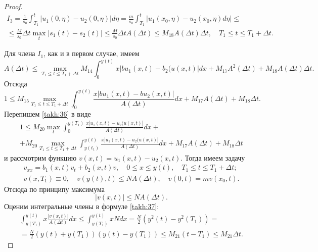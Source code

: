 \begin{proof}
\begin{multline*}
I_3=\frac{1}{s_0}\int_{T_1}^{t}\left|u_1(0,\eta)-u_2(0,\eta)\right|d\eta= %
\frac{m}{s_0}\int_{T_1}^{t}\left|u_1(x_0,\eta)-u_2(x_0,\eta)d\eta\right|\leq 
\\ \leq
\frac{M}{s_0}\Delta t\max\limits_{t}|s_1(t)-s_2(t)| %
\leq\frac{M}{s_0}\Delta tA(\Delta t) \leq M_{18}A(\Delta t)\Delta t, \quad
 T_1\leq t\leq T_1+\Delta t.
\end{multline*}

\noindent
Для члена $I_1$, как и в первом случае, имеем
$$
A(\Delta t)\leq \!\max \limits_{T_1\leq t\leq T_1+\Delta t}M_{14} \!\! \int
_{0}^{y(t)} \!\!\! x|bu_1(x,t)-b_2(u(x,t)|dx+M_{17}A^2(\Delta
t)+M_{18}A(\Delta t)\Delta t.
$$
Отсюда
\begin{equation}
1\leq M_{15}\max\limits_{T_1\leq t\leq T_1+\Delta t}\int
_{0}^{y(t)}\frac{x|bu_1(x,t)-bu_2(x,t)|}{A(\Delta
t)}dx+M_{17}A(\Delta t) +M_{18}\Delta t. 
\label{takh:36}
\end{equation}
Перепишем \eqref{takh:36} в виде
\begin{multline}
1\leq M_{20}\max\limits_{t}\int
_{0}^{y(T_1)}\frac{x|u_1(x,t)-u_2(u(x,t)|}{A(\Delta t)}dx+
\\
+M_{20}\max\limits_{T_1\leq t\leq T_1+\Delta t}\int
_{y(t_1)}^{y(t)}\frac{x|u_1(x,t)-u_2(u(x,t)|}{A(\Delta
t)}dx+ M_{17}A(\Delta t)+M_{18}\Delta t
\label{takh:37}
\end{multline}
и рассмотрим функцию $v(x,t)=u_1(x,t)-u_2(x,t)$. Тогда имеем задачу
\begin{gather*}
v_{xx}=b_1(x,t)v_t+b_2(x,t)v,\quad  0\leq x\leq y(t), \quad  T_1\leq t\leq T_1+\Delta t;
\\
v(x,T_1)\equiv0, \quad  v(y(t),t)\leq NA(\Delta t), \quad  v(0, t)=mv(x_0, t).
\end{gather*}
Отсюда по принципу максимума
\begin{equation}
|v(x,t)|\leq NA(\Delta t). 
\label{takh:38}
\end{equation}
Оценим интегральные члены в формуле \eqref{takh:37}:
\begin{multline*}
\int_{y(T_1)}^{y(t)}x\frac{|v(x,t)|}{A(\Delta t)}dx\leq
\int_{y(T_1)}^{y(t)}xNdx = %
\frac{N}{2}\left(y^2(t)-y^2(T_1)\right)=
\\
=\frac{N}{2}\left(y(t)+y(T_1)\right)\left(y(t)-y(T_1)\right)\leq
M_{21}(t-T_1)\leq M_{21}\Delta t.
\end{multline*}


\end{proof}
